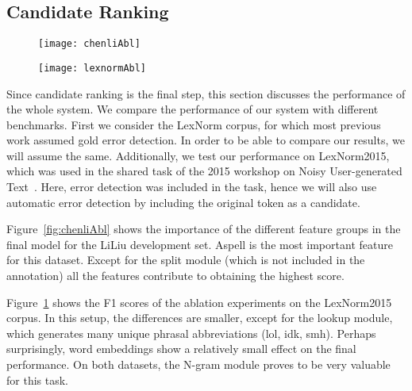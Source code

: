 \documentclass[a4paper,10pt,twoside]{article}
\begin{document}
\subsection{Candidate Ranking}
\begin{figure}
    \centering
    \begin{minipage}{.45\textwidth}
        \centering
        \texttt{[image: chenliAbl]}
        \label{fig:chenliAbl}
    \end{minipage}\hspace{1cm}
    \begin{minipage}{.45\textwidth}
        \centering
        \texttt{[image: lexnormAbl]}
        \label{fig:lexnormAbl}
    \end{minipage}
\end{figure}


Since candidate ranking is the final step, this section discusses the performance
of the whole system. We compare the performance of our system with different 
benchmarks. First we consider the LexNorm corpus, for which most previous work
assumed gold error detection. In order to be able to compare our results, we
will assume the same. Additionally, we test our performance on LexNorm2015,
which was used in the shared task of the 2015 workshop on Noisy User-generated
Text~\cite{baldwin-EtAl:2015:WNUT}.  Here, error detection was included in the
task, hence we will also use automatic error detection by including the
original token as a candidate. 

Figure~\ref{fig:chenliAbl} shows the importance of the different feature groups
in the final model for the LiLiu development set. Aspell is the most important 
feature for this dataset. Except for the split module (which is not included in 
the annotation) all the features contribute to obtaining the highest score.


Figure~\ref{fig:lexnormAbl} shows the F1 scores of the ablation experiments on
the LexNorm2015 corpus. In this setup, the differences are smaller, except for
the lookup module, which generates many unique phrasal abbreviations (lol, idk,
smh).  Perhaps surprisingly, word embeddings show a relatively small effect on
the final performance.  On both datasets, the N-gram module proves to be very
valuable for this task.
\end{document}
